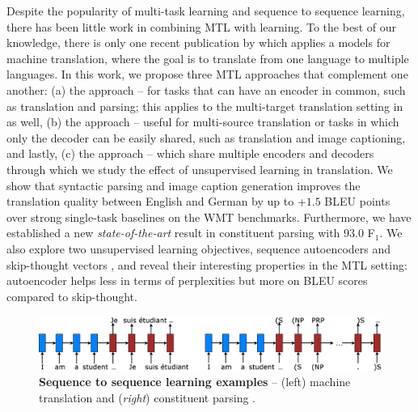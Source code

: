 Despite the popularity of multi-task learning and sequence to sequence
learning, there has been little work in combining MTL with \ssl{}
learning. To the best of our knowledge, there is only one recent
publication by \citet{dong15} which applies a \ssl{} models for machine
translation, where the goal is to translate from one language to
multiple languages.
In this work, we propose three MTL
approaches that complement one another: (a) the {\it \otm} approach -- for
tasks that can have an encoder in common, such as translation and parsing; this 
applies to the multi-target translation setting in \citep{dong15} as well, (b)
the {\it \mto} approach -- useful for multi-source
translation or tasks in which only the decoder can be easily shared,
such as translation and image captioning, and lastly, (c) the {\it \mtm} approach -- which share
multiple encoders and decoders through which we study the effect of unsupervised
learning in translation.
We show
that syntactic parsing and image caption generation improves the
translation quality between English and German by up to +$1.5$ BLEU points over
strong single-task baselines on the WMT benchmarks. 
Furthermore, we have established a new {\it state-of-the-art} result in
constituent parsing with 93.0 F$_1$.
We also explore two unsupervised learning
objectives, sequence autoencoders \citep{dai15} and skip-thought vectors
\citep{kiros15skip}, and reveal their interesting properties in the MTL setting: autoencoder helps less in terms of
  perplexities but more on BLEU scores compared to skip-thought.
\begin{figure}%
\centering
\includegraphics[width=1\textwidth, clip=true, trim= 0 0 0
0]{img/6-1_seq2seq}
\caption[Sequence to sequence learning examples]{{\bf Sequence to sequence learning examples} -- (left) machine
translation \citep{sutskever14} and ({\it right}) constituent parsing
\citep{vinyals15grammar}.}
\label{f:s2s}
\end{figure}


